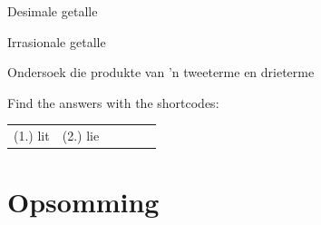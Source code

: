 \begin{Aktiwiteit}{Desimale getalle}
\begin{aktiwiteit}{Irrasionale getalle}
\begin{aktiwiteit}{Ondersoek die produkte van 'n tweeterme en drieterme}
\par {} Find the answers with the shortcodes:
\par \begin{tabular}[h]{cccccc}
(1.) lit  &  (2.) lie  & \end{tabular}

\section{Opsomming}


\begin{itemize}[itemsep=5pt, label=\textbullet{}]


\end{itemize}
\end{aktiwiteit}
\end{aktiwiteit}
\end{Aktiwiteit}
